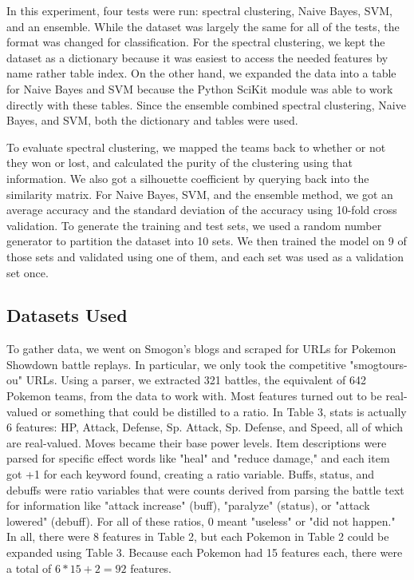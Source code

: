 \documentclass{acm_proc_article-sp}
\begin{document}
In this experiment, four tests were run: spectral clustering, Naive Bayes, SVM, and an ensemble. While the dataset was largely the same for all of the tests, the format was changed for classification. For the spectral clustering, we kept the dataset as a dictionary because it was easiest to access the needed features by name rather table index. On the other hand, we expanded the data into a table for Naive Bayes and SVM because the Python SciKit module was able to work directly with these tables. Since the ensemble combined spectral clustering, Naive Bayes, and SVM, both the dictionary and tables were used.

To evaluate spectral clustering, we mapped the teams back to whether or not they won or lost, and calculated the purity of the clustering using that information. We also got a silhouette coefficient by querying back into the similarity matrix. For Naive Bayes, SVM, and the ensemble method, we got an average accuracy and the standard deviation of the accuracy using 10-fold cross validation. To generate the training and test sets, we used a random number generator to partition the dataset into 10 sets. We then trained the model on 9 of those sets and validated using one of them, and each set was used as a validation set once.

\subsection{Datasets Used}

To gather data, we went on Smogon's blogs and scraped for URLs for Pokemon Showdown battle replays. In particular, we only took the competitive "smogtours-ou" URLs. Using a parser, we extracted 321 battles, the equivalent of 642 Pokemon teams, from the data to work with. Most features turned out to be real-valued or something that could be distilled to a ratio. In Table 3, stats is actually 6 features: HP, Attack, Defense, Sp. Attack, Sp. Defense, and Speed, all of which are real-valued. Moves became their base power levels. Item descriptions were parsed for specific effect words like "heal" and "reduce damage," and each item got +1 for each keyword found, creating a ratio variable. Buffs, status, and debuffs were ratio variables that were counts derived from parsing the battle text for information like "attack increase" (buff), "paralyze" (status), or "attack lowered" (debuff). For all of these ratios, 0 meant "useless" or "did not happen." In all, there were 8 features in Table 2, but each Pokemon in Table 2 could be expanded using Table 3. Because each Pokemon had 15 features each, there were a total of $6 * 15 + 2 = 92$ features.
\end{document}

